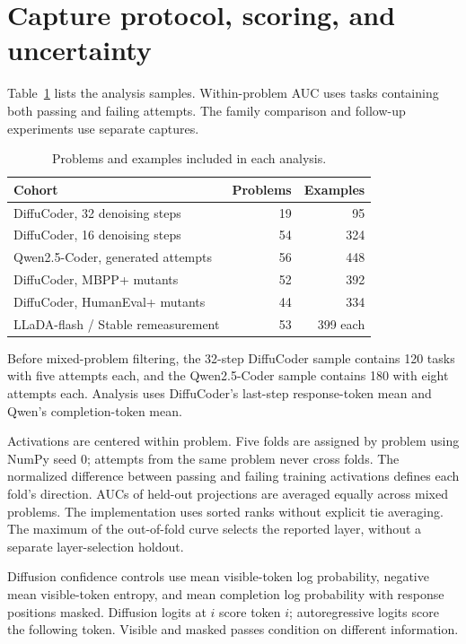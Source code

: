 \clearpage
\section{Capture protocol, scoring, and uncertainty}\label{app:methods}

Table~\ref{tab:cohorts} lists the analysis samples. Within-problem AUC uses tasks containing both passing and failing attempts. The family comparison and follow-up experiments use separate captures.

\begin{table}[htbp]
\centering\small
\caption{Problems and examples included in each analysis.}
\label{tab:cohorts}
\begin{tabular}{@{}p{.49\linewidth}rr@{}}
\toprule
Cohort & Problems & Examples\\
\midrule
DiffuCoder, 32 denoising steps & 19 & 95\\
DiffuCoder, 16 denoising steps & 54 & 324\\
Qwen2.5-Coder, generated attempts & 56 & 448\\
DiffuCoder, MBPP+ mutants & 52 & 392\\
DiffuCoder, HumanEval+ mutants & 44 & 334\\
LLaDA-flash / Stable remeasurement & 53 & 399 each\\
\bottomrule
\end{tabular}
\end{table}

Before mixed-problem filtering, the 32-step DiffuCoder sample contains 120 tasks with five attempts each, and the Qwen2.5-Coder sample contains 180 with eight attempts each. Analysis uses DiffuCoder's last-step response-token mean and Qwen's completion-token mean.

Activations are centered within problem. Five folds are assigned by problem using NumPy seed 0; attempts from the same problem never cross folds. The normalized difference between passing and failing training activations defines each fold's direction. AUCs of held-out projections are averaged equally across mixed problems. The implementation uses sorted ranks without explicit tie averaging. The maximum of the out-of-fold curve selects the reported layer, without a separate layer-selection holdout.

Diffusion confidence controls use mean visible-token log probability, negative mean visible-token entropy, and mean completion log probability with response positions masked. Diffusion logits at $i$ score token $i$; autoregressive logits score the following token. Visible and masked passes condition on different information.

